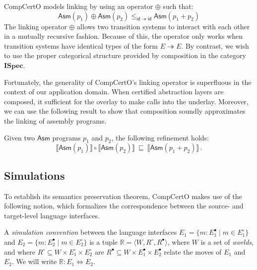 \documentclass[sigplan,10pt,review,anonymous]{acmart}
\newcommand{\kw}[1]{\ensuremath{ \mathsf{#1} }}
\newcommand{\que}{{\circ}}
\newcommand{\ans}{{\bullet}}
\newcommand{\ISpec}{\mathbf{ISpec}}
\begin{document}
CompCertO models linking by using an operator $\oplus$
such that:
\[
  \kw{Asm}(p_1) \oplus \kw{Asm}(p_2)
  \le_{\kw{id} \twoheadrightarrow \kw{id}}
  \kw{Asm}(p_1 + p_2)
\]
The linking operator $\oplus$ allows
two transition systems to interact with each other
in a mutually recursive fashion.
Because of this,
the operator only works when transition systems
have identical types of the form $E \twoheadrightarrow E$.
By contrast,
we wish to use the proper categorical structure
provided by composition in the category $\ISpec$.

Fortunately,
the generality of CompCertO's linking operator is superfluous
in the context of our application domain.
When certified abstraction layers are composed,
it sufficient for the overlay to make calls into the underlay.
Moreover,
we can use the following result
to show that composition soundly approximates
the linking of assembly programs.

\begin{lemma}
Given two \kw{Asm} programs $p_1$ and $p_2$,
the following refinement holds:
\[
  \llbracket \kw{Asm}(p_1) \rrbracket \circ
  \llbracket \kw{Asm}(p_2) \rrbracket \:\sqsubseteq\:
  \llbracket \kw{Asm}(p_1 + p_2) \rrbracket
  \,.
\]
\end{lemma}

\subsection{Simulations}

To establish its semantics preservation theorem,
CompCertO makes use of the following notion,
which formalizes the correspondence between
the source- and target-level language interfaces.

\begin{definition}
A \emph{simulation convention} between
the language interfaces
$E_1 = \{ m : E_1^\ans \mid m \in E_1^\que \}$ and
$E_2 = \{ m : E_2^\ans \mid m \in E_2^\que \}$
is a tuple $\mathbb{R} = \langle W, R^\que, R^\ans \rangle$,
where $W$ is a set of \emph{worlds},
and where
$R^\que \subseteq W \times E_1^\que \times E_2^\que$ are
$R^\ans \subseteq W \times E_1^\ans \times E_2^\ans$
relate the moves of $E_1$ and $E_2$.
We will write $\mathbb{R} : E_1 \Leftrightarrow E_2$.
\end{definition}
\end{document}
